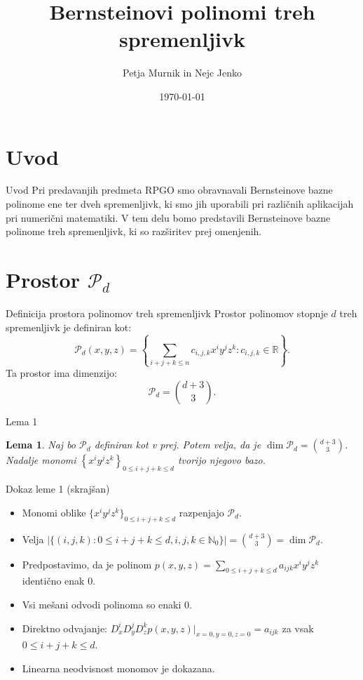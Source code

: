 \documentclass{beamer}
\title{Bernsteinovi polinomi treh spremenljivk}
\author{Petja Murnik in Nejc Jenko}
\date{\today}
\newtheorem{lemma1}{Lema}
\begin{document}
\frame{\titlepage}

\section{Uvod}
\begin{frame}{Uvod}
    Pri predavanjih predmeta RPGO smo obravnavali Bernsteinove bazne polinome ene ter dveh spremenljivk, 
    ki smo jih uporabili pri različnih aplikacijah pri numerični matematiki.
    \newline
    V tem delu bomo predstavili Bernsteinove bazne polinome treh spremenljivk, ki so razširitev prej omenjenih.
\end{frame}

\section{Prostor $\mathcal{P}_d$}
\begin{frame}{Definicija prostora polinomov treh spremenljivk}
    Prostor polinomov stopnje $d$ treh spremenljivk je definiran kot:
    \[
      \mathcal{P}_d(x, y, z) = \left\{ \sum_{i+j+k \leq n} c_{i,j,k} x^i y^j z^k : c_{i,j,k} \in \mathbb{R} \right\}.
    \]
    Ta prostor ima dimenzijo:
    \[
        \mathcal{P}_d = \binom{d+3}{3}.
    \]
\end{frame}


\begin{frame}{Lema 1}
\begin{lemma1}
    Naj bo $\mathcal{P}_d$ definiran kot v prej.
    Potem velja, da je $\dim \mathcal{P}_d = \binom{d+3}{3} $. \\
    Nadalje monomi $\left\{x^i y^j z^k \right\}_{0 \le i  + j + k \le d}$ tvorijo njegovo bazo.
\end{lemma1}
\end{frame}


\begin{frame}{Dokaz leme 1 (skrajšan)}
    \begin{itemize}
        \item Monomi oblike $\{x^i y^j z^k\}_{0 \le i + j + k \le d}$ razpenjajo $\mathcal{P}_d$.
        \item Velja $|\{(i, j, k) : 0 \le i + j + k \le d, i, j, k \in \mathbb{N}_0\}| = \binom{d+3}{3} = \dim \mathcal{P}_d$.
        \item Predpostavimo, da je polinom $p(x, y, z) = \sum_{0 \le i + j + k \le d} a_{ijk} x^i y^j z^k$ identično enak 0.
        \item Vsi mešani odvodi polinoma so enaki 0.
        \item Direktno odvajanje: $D^i_x D^j_y D^k_z p(x, y, z)|_{x=0, y=0, z=0} = a_{ijk}$ za vsak $0 \le i + j + k \le d$.
        \item Linearna neodvisnost monomov je dokazana.
    \end{itemize}
\end{frame}
\end{document}
